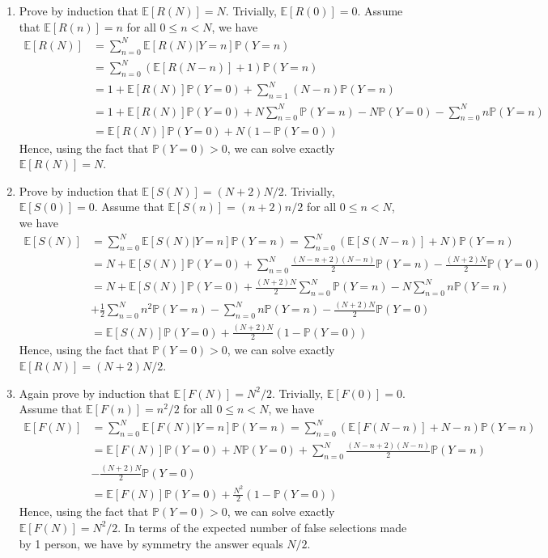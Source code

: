 \documentclass[10pt]{article}
\begin{document}
\begin{enumerate}
\begin{enumerate}
\item Prove by induction that $\mathbb{E}[R(N)] = N$. Trivially, $\mathbb{E}[R(0)] = 0$.  Assume that $\mathbb{E}[R(n)] = n$ for all $0\leq n < N$, we have
\begin{align*}
\mathbb{E}[R(N)] 
&= \sum_{n=0}^N\mathbb{E}[R(N)|Y = n]\mathbb{P}(Y=n) \\
&= \sum_{n=0}^N\left(\mathbb{E}[R(N-n)] + 1\right)\mathbb{P}(Y=n)\\
&= 1 + \mathbb{E}[R(N)]\mathbb{P}(Y=0) + \sum_{n=1}^N\left(N-n\right)\mathbb{P}(Y=n)\\
&= 1 + \mathbb{E}[R(N)]\mathbb{P}(Y=0) + N\sum_{n=0}^N\mathbb{P}(Y=n)-N\mathbb{P}(Y=0)-\sum_{n=0}^Nn\mathbb{P}(Y=n)\\
&= \mathbb{E}[R(N)]\mathbb{P}(Y=0) + N(1-\mathbb{P}(Y=0))
\end{align*}
Hence, using the fact that $\mathbb{P}(Y = 0) >0$, we can solve exactly $\mathbb{E}[R(N)] = N$.

\item Prove by induction that $\mathbb{E}[S(N)] = (N+2)N/2$. Trivially, $\mathbb{E}[S(0)] = 0$.  Assume that $\mathbb{E}[S(n)] = (n+2)n/2$ for all $0\leq n < N$, we have
\begin{align*}
\mathbb{E}[S(N)] 
&= \sum_{n=0}^N\mathbb{E}[S(N)|Y = n]\mathbb{P}(Y=n) = \sum_{n=0}^N\left(\mathbb{E}[S(N-n)] + N\right)\mathbb{P}(Y=n)\\
&= N + \mathbb{E}[S(N)]\mathbb{P}(Y=0) + \sum_{n=0}^N\frac{(N-n+2)(N-n)}{2}\mathbb{P}(Y=n) - \frac{(N+2)N}{2}\mathbb{P}(Y = 0)\\
&= N + \mathbb{E}[S(N)]\mathbb{P}(Y=0) + \frac{(N+2)N}{2}\sum_{n=0}^N\mathbb{P}(Y=n) - N\sum_{n=0}^Nn\mathbb{P}(Y=n)\\
& + \frac{1}{2}\sum_{n=0}^Nn^2\mathbb{P}(Y=n) - \sum_{n=0}^Nn\mathbb{P}(Y=n) - \frac{(N+2)N}{2}\mathbb{P}(Y = 0)\\
&= \mathbb{E}[S(N)]\mathbb{P}(Y=0) + \frac{(N+2)N}{2}(1-\mathbb{P}(Y=0))
\end{align*}
Hence, using the fact that $\mathbb{P}(Y = 0) >0$, we can solve exactly $\mathbb{E}[R(N)] = (N+2)N/2$.

\item Again prove by induction that $\mathbb{E}[F(N)] = N^2/2$. Trivially, $\mathbb{E}[F(0)] = 0$.  Assume that $\mathbb{E}[F(n)] = n^2/2$ for all $0\leq n < N$, we have
\begin{align*}
\mathbb{E}[F(N)] 
&= \sum_{n=0}^N\mathbb{E}[F(N)|Y = n]\mathbb{P}(Y=n) = \sum_{n=0}^N\left(\mathbb{E}[F(N-n)] + N-n\right)\mathbb{P}(Y=n)\\
&= \mathbb{E}[F(N)]\mathbb{P}(Y = 0) + N\mathbb{P}(Y = 0) + \sum_{n = 0}^N\frac{(N-n+2)(N-n)}{2}\mathbb{P}(Y=n)\\ 
& - \frac{(N + 2)N}{2}\mathbb{P}(Y=0)\\
&= \mathbb{E}[F(N)]\mathbb{P}(Y = 0) + \frac{N^2}{2}(1-\mathbb{P}(Y=0))
\end{align*}
Hence, using the fact that $\mathbb{P}(Y = 0) >0$, we can solve exactly $\mathbb{E}[F(N)] = N^2/2$. In terms of the expected number of false selections made by 1 person, we have by symmetry the answer equals $N/2$.


\end{enumerate}
\end{enumerate}
\end{document}
